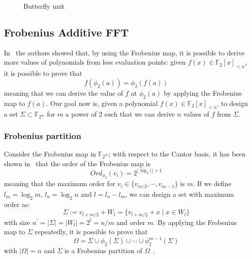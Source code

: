 \begin{figure}
    \caption{Butterfly unit}
    \label{fig:butterfly}
\end{figure}

\subsection{Frobenius Additive FFT}
    In~\cite{van2017frobenius} the authors showed that, by using the Frobenius map, it is possible
    to derive more values of polynomials from less evaluation points: given $f(x) \in \mathds{F}_2[x]_{<n}$,
    it is possible to prove that
    \begin{equation}
        f(\phi_2(a)) = \phi_2(f(a))
    \end{equation}
    meaning that we can derive the value of $f$ at $\phi_2(a)$ by applying the Frobenius map to $f(a)$.
    Our goal now is, given a polynomial $f(x) \in \mathds{F}_2[x]_{<n}$, to design a set $\Sigma \subset \mathds{F}_{2^m}$
    for $m$ a power of 2 such that we can derive $n$ values of $f$ from $\Sigma$.\
    \subsubsection{Frobenius partition}
        Consider the Frobenius map in $\mathds{F}_{2^m}$; with respect to the Cantor basis, it has been shown in~\cite{li2018frobenius}
        that the order of the Frobenius map is
        \begin{equation}
            Ord_{\phi_2}(v_i) = 2^{\lfloor \log_2 i \rfloor+1} 
        \end{equation}
        meaning that the maximum order for $v_i \in \{v_{m/2}, \cdots, v_{m-1}\}$ is $m$. 
        If we define $l_m = \log_2 m$, $l_n = \log_2 n$ and $l = l_n-l_m$, we can design a set with maximum order as:
        \begin{equation}
            \Sigma := v_{l+m/2}+W_l = \{v_{l+m/2} + x \mid x \in W_l\}
        \end{equation}
        with size $n^\prime = |\Sigma| = |W_l| = 2^l = n/m$ and order $m$. By applying the Frobenius map to $\Sigma$ repeatedly, it is possible to prove that
        \begin{equation}
            \Omega = \Sigma \cup \phi_2(\Sigma) \cup \cdots \cup \phi_2^{m-1}(\Sigma)
        \end{equation}
        with $|\Omega| = n$ and $\Sigma$ is a Frobenius partition of $\Omega$~\cite{li2018frobenius}.


